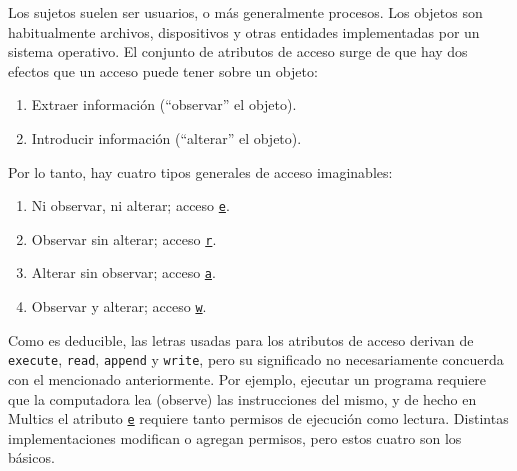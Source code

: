 \documentclass[main.tex]{subfiles}
\begin{document}
Los sujetos suelen ser usuarios, o más generalmente procesos. Los objetos son
habitualmente archivos, dispositivos y otras entidades implementadas por un
sistema operativo.
El conjunto de atributos de acceso surge de que hay dos efectos que un acceso
puede tener sobre un objeto:
\begin{enumerate}
\itemsep0em 
  \item Extraer información (``observar'' el objeto).
  \item Introducir información (``alterar'' el objeto).
\end{enumerate}
Por lo tanto, hay cuatro tipos generales de acceso imaginables:
\begin{enumerate}
\itemsep0em 
  \item Ni observar, ni alterar; acceso \texttt{\underline{e}}.
  \item Observar sin alterar; acceso \texttt{\underline{r}}.
  \item Alterar sin observar; acceso \texttt{\underline{a}}.
  \item Observar y alterar; acceso \texttt{\underline{w}}.
\end{enumerate}
Como es deducible, las letras usadas para los atributos de acceso derivan de
\verb+execute+, \verb+read+, \verb+append+ y \verb+write+, pero su significado
no necesariamente concuerda con el mencionado anteriormente. Por ejemplo,
ejecutar un programa requiere que la computadora lea (observe) las instrucciones
del mismo, y de hecho en Multics el atributo \texttt{\underline{e}} requiere
tanto permisos de ejecución como lectura. Distintas implementaciones modifican o
agregan permisos, pero estos cuatro son los básicos.
\end{document}
